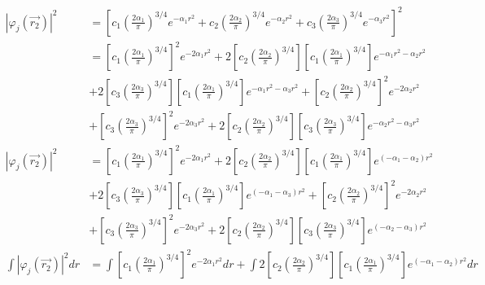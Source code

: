 \documentclass{article}
\begin{document}
\begin{align*}
    |\varphi_j(\vec{r_2})|^2 &= \left[ c_1  \left( \frac{2\alpha_1}{\pi} \right)^{3/4} e^{-\alpha_1 r^2} + c_2 \left( \frac{2\alpha_2}{\pi} \right)^{3/4} e^{-\alpha_2 r^2} + c_3 \left( \frac{2\alpha_3}{\pi} \right)^{3/4} e^{-\alpha_3 r^2} \right] ^2 \\
                             &= \left[ c_1  \left( \frac{2\alpha_1}{\pi} \right)^{3/4} \right] ^2 e^{-2\alpha_1 r^2} + 2 \left[ c_2 \left( \frac{2\alpha_2}{\pi} \right)^{3/4} \right] \left[ c_1  \left( \frac{2\alpha_1}{\pi} \right)^{3/4} \right] e^{-\alpha_1 r^2 - \alpha_2 r^2} \\
                             &+ 2\left[ c_3 \left( \frac{2\alpha_3}{\pi} \right)^{3/4} \right] \left[ c_1  \left( \frac{2\alpha_1}{\pi} \right)^{3/4} \right] e^{-\alpha_1 r^2 - \alpha_3 r^2} + \left[ c_2  \left( \frac{2\alpha_2}{\pi} \right)^{3/4} \right] ^2 e^{-2\alpha_2 r^2} \\ 
                             &+ \left[ c_3  \left( \frac{2\alpha_3}{\pi} \right)^{3/4} \right] ^2 e^{-2\alpha_3 r^2} + 2 \left[ c_2 \left( \frac{2\alpha_2}{\pi} \right)^{3/4} \right] \left[ c_3  \left( \frac{2\alpha_3}{\pi} \right)^{3/4} \right] e^{-\alpha_2 r^2 - \alpha_3 r^2} \\
    |\varphi_j(\vec{r_2})|^2                         &= \left[ c_1  \left( \frac{2\alpha_1}{\pi} \right)^{3/4} \right] ^2 e^{-2\alpha_1 r^2} + 2 \left[ c_2 \left( \frac{2\alpha_2}{\pi} \right)^{3/4} \right] \left[ c_1  \left( \frac{2\alpha_1}{\pi} \right)^{3/4} \right] e^{(-\alpha_1 - \alpha_2 )r^2} \\
                             &+ 2\left[ c_3 \left( \frac{2\alpha_3}{\pi} \right)^{3/4} \right] \left[ c_1  \left( \frac{2\alpha_1}{\pi} \right)^{3/4} \right] e^{(-\alpha_1  - \alpha_3 )r^2} + \left[ c_2  \left( \frac{2\alpha_2}{\pi} \right)^{3/4} \right] ^2 e^{-2\alpha_2 r^2} \\ 
                             &+ \left[ c_3  \left( \frac{2\alpha_3}{\pi} \right)^{3/4} \right] ^2 e^{-2\alpha_3 r^2} + 2 \left[ c_2 \left( \frac{2\alpha_2}{\pi} \right)^{3/4} \right] \left[ c_3  \left( \frac{2\alpha_3}{\pi} \right)^{3/4} \right] e^{(-\alpha_2 - \alpha_3 )r^2} \\
    \int |\varphi_j(\vec{r_2})|^2dr                         &= \int \left[ c_1  \left( \frac{2\alpha_1}{\pi} \right)^{3/4} \right] ^2 e^{-2\alpha_1 r^2}dr + \int 2 \left[ c_2 \left( \frac{2\alpha_2}{\pi} \right)^{3/4} \right] \left[ c_1  \left( \frac{2\alpha_1}{\pi} \right)^{3/4} \right] e^{(-\alpha_1 - \alpha_2 )r^2}dr \\

\end{align*}
\end{document}
